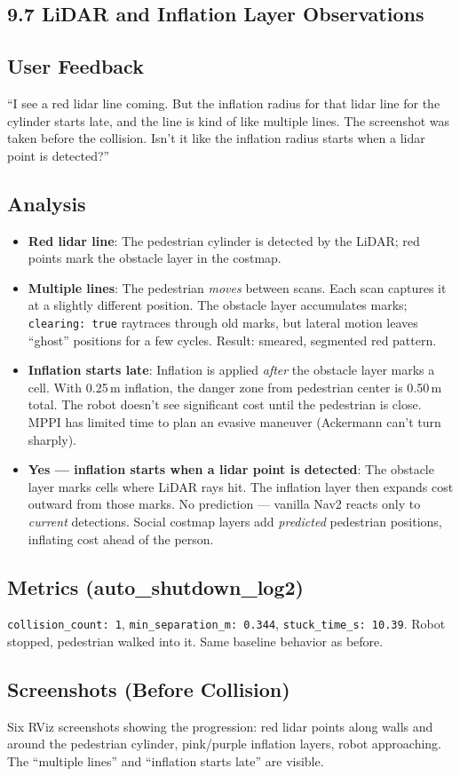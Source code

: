 \documentclass[11pt]{article}
\newcommand{\logentry}[1]{\subsection*{#1}}
\begin{document}

\subsection*{9.7 LiDAR and Inflation Layer Observations}

\logentry{User Feedback}
``I see a red lidar line coming. But the inflation radius for that lidar line
for the cylinder starts late, and the line is kind of like multiple lines. The
screenshot was taken before the collision. Isn't it like the inflation radius
starts when a lidar point is detected?''

\logentry{Analysis}
\begin{itemize}
  \item \textbf{Red lidar line}: The pedestrian cylinder is detected by the
    LiDAR; red points mark the obstacle layer in the costmap.
  \item \textbf{Multiple lines}: The pedestrian \emph{moves} between scans. Each
    scan captures it at a slightly different position. The obstacle layer
    accumulates marks; \texttt{clearing: true} raytraces through old marks, but
    lateral motion leaves ``ghost'' positions for a few cycles. Result: smeared,
    segmented red pattern.
  \item \textbf{Inflation starts late}: Inflation is applied \emph{after} the
    obstacle layer marks a cell. With 0.25\,m inflation, the danger zone from
    pedestrian center is 0.50\,m total. The robot doesn't see significant cost
    until the pedestrian is close. MPPI has limited time to plan an evasive
    maneuver (Ackermann can't turn sharply).
  \item \textbf{Yes --- inflation starts when a lidar point is detected}: The
    obstacle layer marks cells where LiDAR rays hit. The inflation layer then
    expands cost outward from those marks. No prediction --- vanilla Nav2
    reacts only to \emph{current} detections. Social costmap layers add
    \emph{predicted} pedestrian positions, inflating cost ahead of the person.
\end{itemize}

\logentry{Metrics (auto\_shutdown\_log2)}
\texttt{collision\_count: 1}, \texttt{min\_separation\_m: 0.344},
\texttt{stuck\_time\_s: 10.39}. Robot stopped, pedestrian walked into it.
Same baseline behavior as before.

\logentry{Screenshots (Before Collision)}
Six RViz screenshots showing the progression: red lidar points along walls and
around the pedestrian cylinder, pink/purple inflation layers, robot approaching.
The ``multiple lines'' and ``inflation starts late'' are visible.
\end{document}
